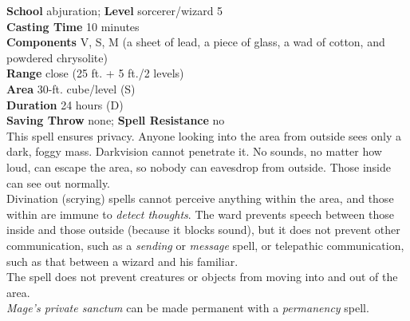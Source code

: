 \textbf{School} abjuration; \textbf{Level} sorcerer/wizard 5\\
\textbf{Casting Time} 10 minutes\\
\textbf{Components} V, S, M (a sheet of lead, a piece of glass, a wad of cotton, and powdered chrysolite)\\
\textbf{Range} close (25 ft. + 5 ft./2 levels)\\
\textbf{Area} 30-ft. cube/level (S)\\
\textbf{Duration} 24 hours (D)\\
\textbf{Saving Throw} none; \textbf{Spell Resistance} no\\
This spell ensures privacy. Anyone looking into the area from outside sees only a dark, foggy mass. Darkvision cannot penetrate it. No sounds, no matter how loud, can escape the area, so nobody can eavesdrop from outside. Those inside can see out normally.\\
Divination (scrying) spells cannot perceive anything within the area, and those within are immune to \textit{detect thoughts}. The ward prevents speech between those inside and those outside (because it blocks sound), but it does not prevent other communication, such as a \textit{sending }or \textit{message }spell, or telepathic communication, such as that between a wizard and his familiar.\\
The spell does not prevent creatures or objects from moving into and out of the area.\\
\textit{Mage's private sanctum }can be made permanent with a \textit{permanency }spell.\\
